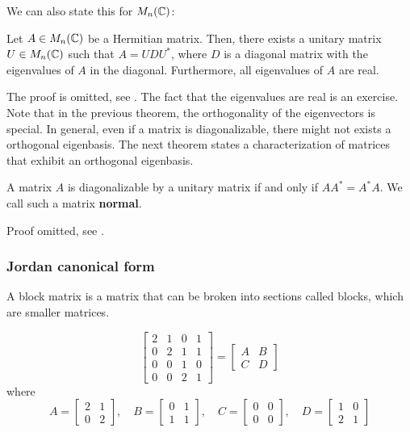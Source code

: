 \documentclass{article}
\begin{document}
We can also state this for $M_n({\mathbb{C}})$:
\begin{theorem}
Let $A\in M_n({\mathbb{C}})$ be a Hermitian matrix. Then, there exists a unitary matrix $U\in M_n({\mathbb{C}})$ such that $A = UDU^*$, where $D$ is a diagonal matrix with the eigenvalues of $A$ in the diagonal. Furthermore, all eigenvalues of $A$ are real.
\end{theorem}


The proof is omitted, see \cite[Chapter 6, Theorem 2.2]{linalgwrong}. The fact that the eigenvalues are real is an exercise. Note that in the previous theorem, the orthogonality of the eigenvectors is special. In general, even if a matrix is diagonalizable, there might not exists a orthogonal eigenbasis. The next theorem states a characterization of matrices that exhibit an orthogonal eigenbasis. 

\begin{theorem}
A matrix $A$ is diagonalizable by a unitary matrix if and only if $AA^*= A^*A$. We call such a matrix \textbf{normal}.
\end{theorem}

Proof omitted, see \cite[Chapter 6, Theorem 2.4]{linalgwrong}.

\subsubsection{Jordan canonical form}

\begin{definition}
A block matrix is a matrix that can be broken into sections called blocks, which are smaller matrices.
\end{definition}

\begin{example}
$$ \begin{bmatrix} 2 & 1 & 0 & 1  \\ 0 & 2 &1 & 1 \\ 0 & 0 & 1 & 0 \\ 0 & 0 & 2 & 1 \end{bmatrix} = \begin{bmatrix} A & B \\ C & D \end{bmatrix}$$
where $$ A= \begin{bmatrix} 2 & 1 \\ 0 & 2 \end{bmatrix}, \quad B= \begin{bmatrix} 0 & 1 \\ 1 & 1 \end{bmatrix}, \quad C= \begin{bmatrix} 0 & 0 \\ 0 & 0 \end{bmatrix} , \quad D= \begin{bmatrix} 1 & 0 \\ 2 & 1 \end{bmatrix}$$
\end{example}
\end{document}
